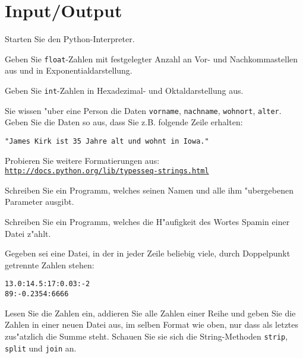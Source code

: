 \section*{Input/Output}
\begin{aufgabe}
Starten Sie den Python-Interpreter. 
\begin{auflistung}
\item Geben Sie \lstinline{float}-Zahlen mit festgelegter Anzahl an Vor- und Nachkommastellen aus und in Exponentialdarstellung.
\item Geben Sie \lstinline{int}-Zahlen in Hexadezimal- und Oktaldarstellung aus.
\item Sie wissen "uber eine Person die Daten \lstinline{vorname}, \lstinline{nachname}, \lstinline{wohnort}, \lstinline{alter}. Geben Sie die Daten so aus, dass Sie z.B. folgende Zeile erhalten: 
\begin{verbatim}
"James Kirk ist 35 Jahre alt und wohnt in Iowa."
\end{verbatim}
\item Probieren Sie weitere Formatierungen aus:\\ \texttt{\underline{http://docs.python.org/lib/typesseq-strings.html}}
\end{auflistung}
\end{aufgabe}

\begin{aufgabe}[Kommandozeilenparameter]
Schreiben Sie ein Programm, welches seinen Namen und alle ihm "ubergebenen Parameter ausgibt.
\end{aufgabe}

\begin{aufgabe}
Schreiben Sie ein Programm, welches die H"aufigkeit des Wortes \glqq Spam\grqq in einer Datei z"ahlt.
\end{aufgabe}

\begin{aufgabe}
Gegeben sei eine Datei, in der in jeder Zeile beliebig viele, durch Doppelpunkt getrennte Zahlen stehen:
\begin{verbatim}
13.0:14.5:17:0.03:-2
89:-0.2354:6666
\end{verbatim}
Lesen Sie die Zahlen ein, addieren Sie alle Zahlen einer Reihe und geben Sie die Zahlen in einer neuen Datei aus, im selben Format wie oben, nur dass als letztes zus"atzlich die Summe steht. \hinweis Schauen Sie sie sich die String-Methoden \lstinline{strip}, \lstinline{split} und \lstinline{join} an.
\end{aufgabe}


